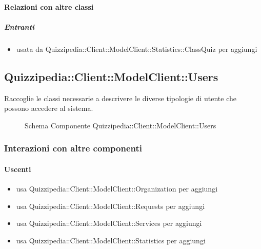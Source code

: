 \paragraph{Relazioni con altre classi}
\subparagraph{Entranti}
\begin{itemize}
\item usata da Quizzipedia::Client::ModelClient::Statistics::ClassQuiz per aggiungi
\end{itemize}
\subsection{Quizzipedia::Client::ModelClient::Users}
Raccoglie le classi necessarie a descrivere le diverse tipologie di utente che possono accedere al sistema.
\begin{figure}[H]
\centering
\noindent{}
\caption[Schema Componente Quizzipedia::Client::ModelClient::Users]{Schema Componente Quizzipedia::Client::ModelClient::Users}
\end{figure}
\subsubsection{Interazioni con altre componenti}
\paragraph{Uscenti}
\begin{itemize}
\item usa Quizzipedia::Client::ModelClient::Organization per aggiungi
\item usa Quizzipedia::Client::ModelClient::Requests per aggiungi
\item usa Quizzipedia::Client::ModelClient::Services per aggiungi
\item usa Quizzipedia::Client::ModelClient::Statistics per aggiungi
\end{itemize}
